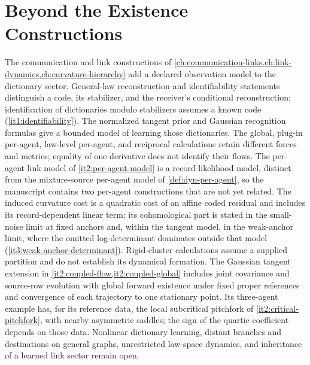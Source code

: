 \chapter{Beyond the Existence Constructions}
\label{ch:outlook}

The communication and link constructions of \cref{ch:communication-links,ch:link-dynamics,ch:curvature-hierarchy} add a declared observation model to the dictionary sector. General-law reconstruction and identifiability statements distinguish a code, its stabilizer, and the receiver's conditional reconstruction; identification of dictionaries modulo stabilizers assumes a known code (\cref{it1:identifiability}). The normalized tangent prior and Gaussian recognition formulas give a bounded model of learning those dictionaries. The global, plug-in per-agent, law-level per-agent, and reciprocal calculations retain different forces and metrics; equality of one derivative does not identify their flows. The per-agent link model of \cref{it2:per-agent-model} is a record-likelihood model, distinct from the mixture-source per-agent model of \cref{def:dyn-per-agent}, so the manuscript contains two per-agent constructions that are not yet related. The induced curvature cost is a quadratic cost of an affine coded residual and includes its record-dependent linear term; its cohomological part is stated in the small-noise limit at fixed anchors and, within the tangent model, in the weak-anchor limit, where the omitted log-determinant dominates outside that model (\cref{it3:weak-anchor-determinant}). Rigid-cluster calculations assume a supplied partition and do not establish its dynamical formation. The Gaussian tangent extension in \cref{it2:coupled-flow,it2:coupled-global} includes joint covariance and source-row evolution with global forward existence under fixed proper references and convergence of each trajectory to one stationary point. Its three-agent example has, for its reference data, the local subcritical pitchfork of \cref{it2:critical-pitchfork}, with nearby asymmetric saddles; the sign of the quartic coefficient depends on those data. Nonlinear dictionary learning, distant branches and destinations on general graphs, unrestricted law-space dynamics, and inheritance of a learned link sector remain open.

